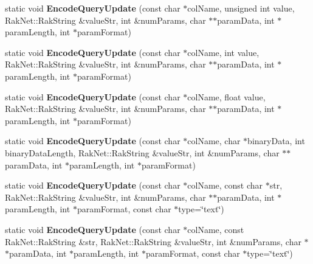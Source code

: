 \begin{DoxyCompactItemize}
\item 
\hypertarget{class_postgre_s_q_l_interface_a92ae1030cd9343f93dd2021b32621e66}{static void {\bfseries Encode\-Query\-Update} (const char $\ast$col\-Name, unsigned int value, Rak\-Net\-::\-Rak\-String \&value\-Str, int \&num\-Params, char $\ast$$\ast$param\-Data, int $\ast$param\-Length, int $\ast$param\-Format)}\label{class_postgre_s_q_l_interface_a92ae1030cd9343f93dd2021b32621e66}

\item 
\hypertarget{class_postgre_s_q_l_interface_af8ae83074f31b98572fece8da5afc8cc}{static void {\bfseries Encode\-Query\-Update} (const char $\ast$col\-Name, int value, Rak\-Net\-::\-Rak\-String \&value\-Str, int \&num\-Params, char $\ast$$\ast$param\-Data, int $\ast$param\-Length, int $\ast$param\-Format)}\label{class_postgre_s_q_l_interface_af8ae83074f31b98572fece8da5afc8cc}

\item 
\hypertarget{class_postgre_s_q_l_interface_a755a113e0d3135b0e0cd34ffe6fb55a5}{static void {\bfseries Encode\-Query\-Update} (const char $\ast$col\-Name, float value, Rak\-Net\-::\-Rak\-String \&value\-Str, int \&num\-Params, char $\ast$$\ast$param\-Data, int $\ast$param\-Length, int $\ast$param\-Format)}\label{class_postgre_s_q_l_interface_a755a113e0d3135b0e0cd34ffe6fb55a5}

\item 
\hypertarget{class_postgre_s_q_l_interface_a13c958ab48a40878cffacd83a296389e}{static void {\bfseries Encode\-Query\-Update} (const char $\ast$col\-Name, char $\ast$binary\-Data, int binary\-Data\-Length, Rak\-Net\-::\-Rak\-String \&value\-Str, int \&num\-Params, char $\ast$$\ast$param\-Data, int $\ast$param\-Length, int $\ast$param\-Format)}\label{class_postgre_s_q_l_interface_a13c958ab48a40878cffacd83a296389e}

\item 
\hypertarget{class_postgre_s_q_l_interface_af7b270fcfab6ee14a8d0badf32d5c131}{static void {\bfseries Encode\-Query\-Update} (const char $\ast$col\-Name, const char $\ast$str, Rak\-Net\-::\-Rak\-String \&value\-Str, int \&num\-Params, char $\ast$$\ast$param\-Data, int $\ast$param\-Length, int $\ast$param\-Format, const char $\ast$type=\char`\"{}text\char`\"{})}\label{class_postgre_s_q_l_interface_af7b270fcfab6ee14a8d0badf32d5c131}

\item 
\hypertarget{class_postgre_s_q_l_interface_aae3b42553e9eb87ee9a27a7e54e6bdea}{static void {\bfseries Encode\-Query\-Update} (const char $\ast$col\-Name, const Rak\-Net\-::\-Rak\-String \&str, Rak\-Net\-::\-Rak\-String \&value\-Str, int \&num\-Params, char $\ast$$\ast$param\-Data, int $\ast$param\-Length, int $\ast$param\-Format, const char $\ast$type=\char`\"{}text\char`\"{})}\label{class_postgre_s_q_l_interface_aae3b42553e9eb87ee9a27a7e54e6bdea}


\end{DoxyCompactItemize}
